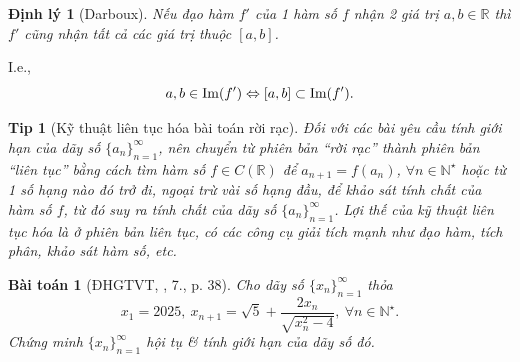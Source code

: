 \documentclass{article}
\newtheorem{baitoan}{Bài toán}
\newtheorem{dinhly}{Định lý}
\newtheorem{tip}{Tip}
\begin{document}
\begin{dinhly}[Darboux]
	Nếu đạo hàm $f'$ của 1 hàm số $f$ nhận 2 giá trị $a,b\in\mathbb{R}$ thì $f'$ cũng nhận tất cả các giá trị thuộc $[a,b]$.
\end{dinhly}
I.e.,
\begin{equation*}
	a,b\in{\rm Im}(f')\Leftrightarrow[a,b]\subset{\rm Im}(f').
\end{equation*}

\begin{tip}[Kỹ thuật liên tục hóa bài toán rời rạc]
	Đối với các bài yêu cầu tính giới hạn của dãy số $\{a_n\}_{n=1}^\infty$, nên chuyển từ phiên bản ``rời rạc'' thành phiên bản ``liên tục'' bằng cách tìm hàm số $f\in C(\mathbb{R})$ để $a_{n+1} = f(a_n)$, $\forall n\in\mathbb{N}^\star$ hoặc từ 1 số hạng nào đó trở đi, ngoại trừ vài số hạng đầu, để khảo sát tính chất của hàm số $f$, từ đó suy ra tính chất của dãy số $\{a_n\}_{n=1}^\infty$. Lợi thế của kỹ thuật liên tục hóa là ở phiên bản liên tục, có các công cụ giải tích mạnh như đạo hàm, tích phân, khảo sát hàm số, etc.
\end{tip}

\begin{baitoan}[ĐHGTVT, \cite{VMS_VMC2025}, 7., p. 38]
	Cho dãy số $\{x_n\}_{n=1}^\infty$ thỏa
	\begin{equation*}
		x_1 = 2025,\ x_{n+1} = \sqrt{5} + \frac{2x_n}{\sqrt{x_n^2 - 4}},\ \forall n\in\mathbb{N}^\star.
	\end{equation*}
	Chứng minh $\{x_n\}_{n=1}^\infty$ hội tụ \& tính giới hạn của dãy số đó.
\end{baitoan}
\end{document}
